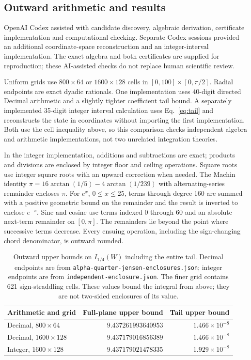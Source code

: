 \documentclass[11pt]{article}
\begin{document}
\subsection{Outward arithmetic and results}
OpenAI Codex assisted with candidate discovery, algebraic derivation,
certificate implementation and computational checking. Separate Codex sessions
provided an additional coordinate-space reconstruction and an integer-interval
implementation. The exact algebra and both certificates are supplied for
reproduction; these AI-assisted checks do not replace human scientific review.

Uniform grids use $800\times64$ or $1600\times128$ cells in
$[0,100]\times[0,\pi/2]$. Radial endpoints are exact dyadic rationals.
One implementation uses 40-digit directed Decimal arithmetic and a
slightly tighter coefficient tail bound. A separately implemented
35-digit integer interval calculation uses Eq.~\eqref{eq:tail} and
reconstructs the state in coordinates without importing the first
implementation.
Both use the cell inequality above, so this comparison checks independent
algebra and arithmetic implementations, not two unrelated integration theories.

In the integer implementation, additions and subtractions are exact;
products and divisions are enclosed by integer floor and ceiling operations.
Square roots use integer square roots with an upward correction when needed.
The Machin identity
$\pi=16\arctan(1/5)-4\arctan(1/239)$ with alternating-series remainder
encloses $\pi$. For $e^x$, $0\leq x\leq25$, terms through degree 160
are summed with a positive geometric bound on the remainder and the result
is inverted to enclose $e^{-x}$.
Sine and cosine use terms indexed $0$ through $60$ and an absolute
next-term remainder on $[0,\pi]$. The remainders lie beyond the point
where successive terms decrease. Every ensuing operation, including
the sign-changing chord denominator, is outward rounded.

\begin{table}[ht]
\centering
\small
\begin{tabular}{lrr}
\toprule
Arithmetic and grid & Full-plane upper bound & Tail upper bound\\
\midrule
Decimal, $800\times64$ & $9.437261993640953$ & $1.466\times10^{-8}$\\
Decimal, $1600\times128$ & $9.437179016856389$ & $1.466\times10^{-8}$\\
Integer, $1600\times128$ & $9.437179021478335$ & $1.929\times10^{-8}$\\
\bottomrule
\end{tabular}
\caption{Outward upper bounds on $I_{1/4}(W)$ including the entire tail.
Decimal endpoints are from \texttt{alpha-quarter-jensen-enclosures.json};
integer endpoints are from \texttt{independent-enclosure.json}.
The finer grid contains 621 sign-straddling cells.
These values bound the integral from above; they are not two-sided
enclosures of its value.}
\label{tab:bounds}
\end{table}
\end{document}
